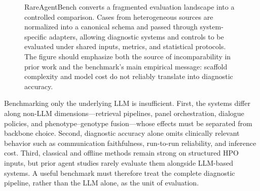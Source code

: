 \documentclass[letterpaper]{article} %
\begin{document}
\begin{figure}[t]
  \centering
  \caption{RareAgentBench converts a fragmented evaluation landscape into a controlled comparison. Cases from heterogeneous sources are normalized into a canonical schema and passed through system-specific adapters, allowing diagnostic systems and controls to be evaluated under shared inputs, metrics, and statistical protocols. The figure should emphasize both the source of incomparability in prior work and the benchmark's main empirical message: scaffold complexity and model cost do not reliably translate into diagnostic accuracy.}
  \label{fig:rareagentbench-overview}
\end{figure}

Benchmarking only the underlying LLM is insufficient. First, the systems differ along non-LLM dimensions---retrieval pipelines, panel orchestration, dialogue policies, and phenotype--genotype fusion---whose effects must be separated from backbone choice. Second, diagnostic accuracy alone omits clinically relevant behavior such as communication faithfulness, run-to-run reliability, and inference cost. Third, classical and offline methods remain strong on structured HPO inputs, but prior agent studies rarely evaluate them alongside LLM-based systems. A useful benchmark must therefore treat the complete diagnostic pipeline, rather than the LLM alone, as the unit of evaluation.
\end{document}
